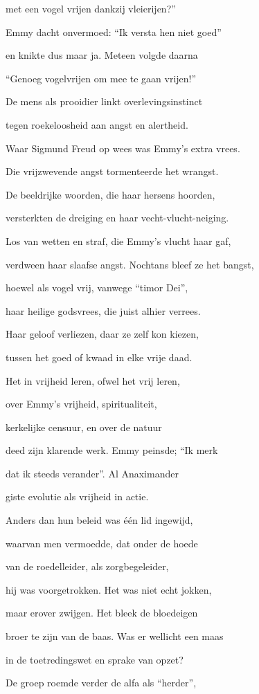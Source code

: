 met een vogel vrijen
dankzij vleierijen?”

Emmy dacht onvermoed:
“Ik versta hen niet goed”

en knikte dus maar ja.
Meteen volgde daarna

“Genoeg vogelvrijen
om mee te gaan vrijen!”

De mens als prooidier linkt
overlevingsinstinct

tegen roekeloosheid
aan angst en alertheid.

Waar Sigmund Freud op wees
was Emmy’s extra vrees.

Die vrijzwevende angst
tormenteerde het wrangst.

De beeldrijke woorden,
die haar hersens hoorden,

versterkten de dreiging
en haar vecht-vlucht-neiging.

Los van wetten en straf,
die Emmy’s vlucht haar gaf,

verdween haar slaafse angst.
Nochtans bleef ze het bangst,

hoewel als vogel vrij,
vanwege “timor Dei”,

haar heilige godsvrees,
die juist alhier verrees.

Haar geloof verliezen,
daar ze zelf kon kiezen,

tussen het goed of kwaad
in elke vrije daad.

Het in vrijheid leren,
ofwel het vrij leren,

over Emmy’s vrijheid,
spiritualiteit,

kerkelijke censuur,
en over de natuur

deed zijn klarende werk.
Emmy peinsde; “Ik merk

dat ik steeds verander”.
Al Anaximander

giste evolutie
als vrijheid in actie.

Anders dan hun beleid
was één lid ingewijd,

waarvan men vermoedde,
dat onder de hoede

van de roedelleider,
als zorgbegeleider,

hij was voorgetrokken.
Het was niet echt jokken,

maar erover zwijgen.
Het bleek de bloedeigen

broer te zijn van de baas.
Was er wellicht een maas

in de toetredingswet
en sprake van opzet?

De groep roemde verder
de alfa als “herder”,

